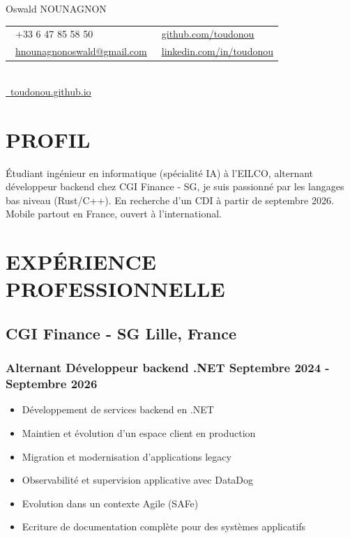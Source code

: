 \documentclass[11pt]{article} %
\begin{document}
\begin{center}
	\begin{minipage}[c]{0.75\textwidth}
		{\fontsize{36}{40}\selectfont Oswald NOUNAGNON} \\[0.1cm]

		\begin{tabular}{ll}
			\faPhone\ +33 6 47 85 58 50 &
			\faGithub\ \href{https://github.com/toudonou}{\underline{github.com/toudonou}}
			\\[0.5em]
			\faEnvelope\ \href{mailto:hnounagnonoswald@gmail.com}
			{\underline{hnounagnonoswald@gmail.com}}
			                            &
			\faLinkedin\ \href{https://www.linkedin.com/in/toudonou}
			{\underline{linkedin.com/in/toudonou}}
		\end{tabular}
	\end{minipage}
	\hfill
	\begin{minipage}[c]{0.20\textwidth}
		\centering
		\\[0.1cm]
		\href{https://toudonou.github.io/}{\faGlobe\ \underline{toudonou.github.io}}
	\end{minipage}
\end{center}

\section{PROFIL}
Étudiant ingénieur en informatique (spécialité IA) à l'EILCO, alternant développeur backend chez CGI Finance - SG, je suis passionné par les langages bas niveau (Rust/C++). En recherche d'un CDI à partir de septembre 2026.
Mobile partout en France, ouvert à l'international.

\section{EXPÉRIENCE PROFESSIONNELLE}

\subsection{CGI Finance - SG \hfill Lille, France}

\subsubsection{Alternant Développeur backend .NET \hfill  Septembre 2024 - Septembre 2026}
\begin{itemize}
	\item Développement de services backend en .NET
	\item Maintien et évolution d'un espace client en production
	\item Migration et modernisation d'applications legacy
	\item Observabilité et supervision applicative avec DataDog
	\item Evolution dans un contexte Agile (SAFe)
	\item Ecriture de documentation complète pour des systèmes applicatifs
\end{itemize}
\end{document}

